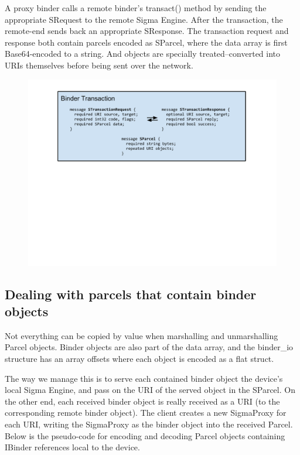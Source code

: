 \documentclass[prodmode]{acmlarge}
\begin{document}
A proxy binder calls a remote binder's transact() method by sending the appropriate SRequest to the remote Sigma Engine. After the transaction, the remote-end sends back an appropriate SResponse. The transaction request and response both contain parcels encoded as SParcel, where the data array is first Base64-encoded to a string. And objects are specially treated--converted into URIs themselves before being sent over the network.

\begin{figure}[h!]
\centering
\includegraphics[width=\columnwidth]{drawings/WireBinderTransaction.pdf}
\end{figure}


\subsection{Dealing with parcels that contain binder objects}

Not everything can be copied by value when marshalling and unmarshalling Parcel objects. Binder objects are also part of the data array, and the binder\_io structure has an array offsets where each object is encoded as a flat struct.

The way we manage this is to serve each contained binder object the device's local Sigma Engine, and pass on the URI of the served object in the SParcel. On the other end, each received binder object is really received as a URI (to the corresponding remote binder object). The client creates a new SigmaProxy for each URI, writing the SigmaProxy as the binder object into the received Parcel. Below is the pseudo-code for encoding and decoding Parcel objects containing IBinder references local to the device.
\end{document}
